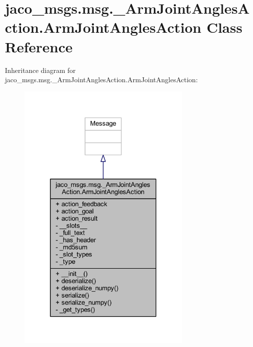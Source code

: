 \hypertarget{classjaco__msgs_1_1msg_1_1__ArmJointAnglesAction_1_1ArmJointAnglesAction}{}\section{jaco\+\_\+msgs.\+msg.\+\_\+\+Arm\+Joint\+Angles\+Action.\+Arm\+Joint\+Angles\+Action Class Reference}
\label{classjaco__msgs_1_1msg_1_1__ArmJointAnglesAction_1_1ArmJointAnglesAction}


Inheritance diagram for jaco\+\_\+msgs.\+msg.\+\_\+\+Arm\+Joint\+Angles\+Action.\+Arm\+Joint\+Angles\+Action\+:
\nopagebreak
\begin{figure}[H]
\begin{center}
\leavevmode
\includegraphics[width=242pt]{d0/d5c/classjaco__msgs_1_1msg_1_1__ArmJointAnglesAction_1_1ArmJointAnglesAction__inherit__graph}
\end{center}
\end{figure}


